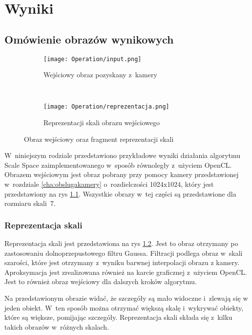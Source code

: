 \chapter{Wyniki}
\label{cha:wyniki}

\section{Omówienie obrazów wynikowych}
\label{sec:testy}

\begin{figure}[h]
\begin{center}

\begin{subfigure}[t]{0.3\textwidth}
\texttt{[image: Operation/input.png]}
\caption{Wejściowy obraz pozyskany z~kamery}
\label{fig:input}
\end{subfigure}
~
\begin{subfigure}[t]{0.3\textwidth}
\texttt{[image: Operation/reprezentacja.png]}
\caption{Reprezentacji skali obrazu wejściowego}
\label{fig:dzialanieRep}
\end{subfigure}

\end{center}
\label{fig:inputIDzialanie}
\caption{Obraz wejściowy oraz fragment reprezentacji skali}
\end{figure}

W~niniejszym rodziale przedstawiono przykładowe wyniki działania algorytmu Scale Space zaimplementowanego w~sposób równoległy z~użyciem OpenCL. Obrazem wejściowym jest obraz pobrany przy pomocy kamery przedstawionej w~rozdziale \ref{cha:obslugakamery} o~rozdielczości 1024x1024, który jest przedstawiony na rys \ref{fig:input}. Wszystkie obrazy w~tej części są przedstawione dla rozmiaru skali~7.

\subsection{Reprezentacja skali}
\label{sec:dzialanieRep}

Reprezentacja skali jest przedstawiona na rys \ref{fig:dzialanieRep}. Jest to obraz otrzymany po zastosowaniu dolnoprzepustowego filtru Gaussa. Filtracji podlega obraz w~skali szarości, które jest otrzymany z~wyniku barwnej interpolacji obrazu z kamery. Aproksymacja jest zrealizowana również na karcie graficznej z~użyciem OpenCL. Jest to również obraz wejściowy dla dalszych kroków algorytmu.

Na przedstawionym obrazie widać, że szczegóły są mało widoczne i~zlewają się w jeden obiekt. W~ten sposób można otrzymać większą skalę i~wykrywać obiekty, które są większe, pomijając szczegóły. Reprezentacja skali składa się z~kilku takich obrazów w~różnych skalach.


